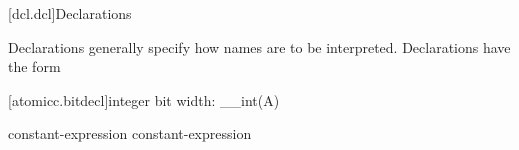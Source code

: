 [dcl.dcl]{Declarations}%


\pnum
Declarations generally specify how names are to be interpreted. Declarations have
the form

[atomicc.bitdecl]{integer bit width: __int(A)}

\begin{bnf}
\br
     \terminal{(} constant-expression \terminal{)} \br
     \terminal{(} constant-expression \terminal{)}
\end{bnf}
